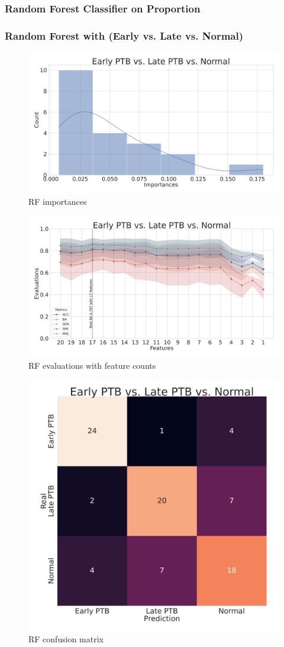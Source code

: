 \documentclass{beamer}
\begin{document}
    \subsubsection{Random Forest Classifier on Proportion}
    \begin{frame}[allowframebreaks]
        \frametitle{Random Forest with (Early vs. Late vs. Normal)}

        \begin{figure}
            \includegraphics[width=0.8 \linewidth]{figures/RandomForest_Proportion/RF.DADA2.homd.Mouth/importances.pdf}
            \caption{RF importances}
        \end{figure}

        \begin{figure}
            \includegraphics[width=0.8 \linewidth]{figures/RandomForest_Proportion/RF.DADA2.homd.Mouth/metrics.pdf}
            \caption{RF evaluations with feature counts}
        \end{figure}

        \begin{figure}
            \includegraphics[width=0.5 \linewidth]{figures/RandomForest_Proportion/RF.DADA2.homd.Mouth/heatmap.pdf}
            \caption{RF confusion matrix}
        \end{figure}
    \end{frame}
\end{document}
